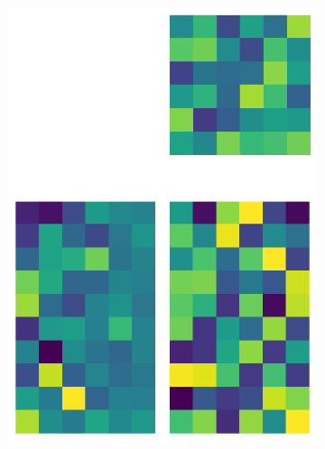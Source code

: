 \documentclass[10pt,twocolumn]{article}
\begin{document}
\begin{figure}[H]
\begin{subfigure}[t]{.15\textwidth}
\centering
\includegraphics[scale=.2]{DWGs/random-matrix-reconstruction-PCs-6.png}
\caption{ }
\end{subfigure}
\begin{subfigure}[t]{.15\textwidth}
\centering

\end{subfigure}
\end{figure}
\end{document}
